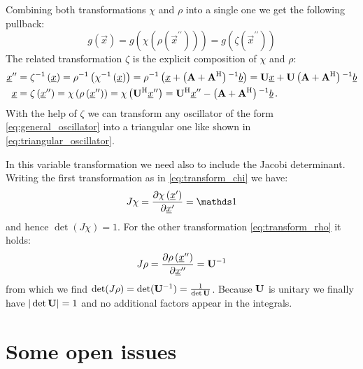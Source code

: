 \documentclass[a4paper,10pt]{article}
\begin{document}
Combining both transformations $\chi$ and $\rho$ into a single one
we get the following pullback:
\begin{equation}
  g\left(\vec{x}\right)
  = g\left(\chi\left(\rho\left(\vec{x}^{\prime\prime}\right)\right)\right)
  = g\left(\zeta\left(\vec{x}^{\prime\prime}\right)\right)
\end{equation}
The related transformation $\zeta$ is the explicit
composition of $\chi$ and $\rho$:
\begin{equation*}
\begin{split}
  \underline{x}^{\prime\prime} & = \zeta{}^{-1} \left(\underline{x}\right)
                  = \rho{}^{-1} \left( \chi{}^{-1} \left(\underline{x}\right) \right)
                  = \rho{}^{-1} \left(\underline{x} + \left(\mathbf{A} + \mathbf{A}{}^{\textnormal{H}}\right){}^{-1} \underline{b}\right)
                  = \mathbf{U} \underline{x} + \mathbf{U} \left(\mathbf{A} + \mathbf{A}{}^{\textnormal{H}}\right){}^{-1} \underline{b} \\
  \underline{x} & = \zeta \left(\underline{x}^{\prime\prime}\right)
            = \chi \left( \rho \left(\underline{x}^{\prime\prime}\right) \right)
            = \chi \left( \mathbf{U}{}^{\textnormal{H}} \underline{x}^{\prime\prime} \right)
            = \mathbf{U}{}^{\textnormal{H}} \underline{x}^{\prime\prime} - \left(\mathbf{A} + \mathbf{A}{}^{\textnormal{H}}\right){}^{-1} \underline{b} \,.
\end{split}
\end{equation*}
With the help of $\zeta$ we can transform any oscillator of
the form \eqref{eq:general_oscillator} into a triangular
one like shown in \eqref{eq:triangular_oscillator}.

In this variable transformation we need also to include
the Jacobi determinant.
Writing the first transformation as in \eqref{eq:transform_chi} we have:
\begin{equation}
  J\chi = \pdiff{\chi\left( \vec{x}^{\prime} \right)}{\vec{x}^{\prime}} = \id
\end{equation}
and hence $\det(J\chi) = 1$. For the other transformation
\eqref{eq:transform_rho} it holds:
\begin{equation}
 J\rho = \frac{\partial \rho\left(\underline{x}^{\prime\prime}\right)}{\partial \underline{x}^{\prime\prime}} = \mathbf{U}{}^{-1}
\end{equation}
from which we find $\det(J\rho) = \det(\mathbf{U}{}^{-1}) = \frac{1}{\det\mathbf{U}}$.
Because $\mathbf{U}$ is unitary we finally have $|\det\mathbf{U}| = 1$ and no
additional factors appear in the integrals.


\section{Some open issues}
\end{document}
